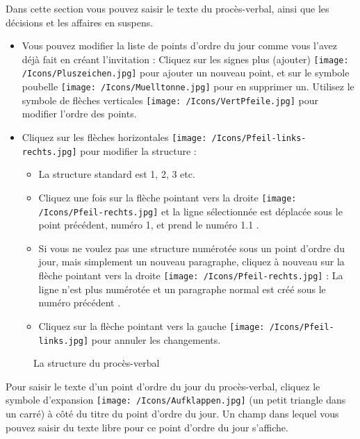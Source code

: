 Dans cette section vous pouvez saisir le texte du procès-verbal, ainsi que les décisions et les affaires en suspens.

\begin{itemize}
\item
Vous pouvez modifier la liste de points d'ordre du jour comme vous l'avez déjà fait en créant l'invitation : Cliquez sur les signes plus (ajouter) \texttt{[image: /Icons/Pluszeichen.jpg]}  pour ajouter un nouveau point, et sur le symbole poubelle \texttt{[image: /Icons/Muelltonne.jpg]}  pour en supprimer un. Utilisez le symbole de flèches verticales \texttt{[image: /Icons/VertPfeile.jpg]}  pour modifier l'ordre des points.
\item
Cliquez sur les flèches horizontales \texttt{[image: /Icons/Pfeil-links-rechts.jpg]}  pour modifier la structure :

	\begin{itemize}
		\item
		La structure standard est 1, 2, 3 etc. 
		\item
		Cliquez une fois sur la flèche pointant vers la droite \texttt{[image: /Icons/Pfeil-rechts.jpg]}  et la ligne sélectionnée est déplacée sous le point précédent, numéro 1, et prend le numéro 1.1 .
		\item
		Si vous ne voulez pas une structure numérotée sous un point d'ordre du jour, mais simplement un nouveau paragraphe, cliquez à nouveau sur la flèche pointant vers la droite \texttt{[image: /Icons/Pfeil-rechts.jpg]}  : La ligne n'est plus numérotée et un paragraphe normal est créé sous le numéro précédent .
		\item
		Cliquez sur la flèche pointant vers la gauche \texttt{[image: /Icons/Pfeil-links.jpg]}  pour annuler les changements.
	\end{itemize}
\end{itemize}

\begin{figure}[H]
\caption{La structure du procès-verbal}
\end{figure}

Pour saisir le texte d'un point d'ordre du jour du procès-verbal, cliquez le symbole d'expansion \texttt{[image: /Icons/Aufklappen.jpg]}  (un petit triangle dans un carré) à côté du titre du point d'ordre du jour. Un champ dans lequel vous pouvez saisir du texte libre pour ce point d'ordre du jour  s'affiche.

